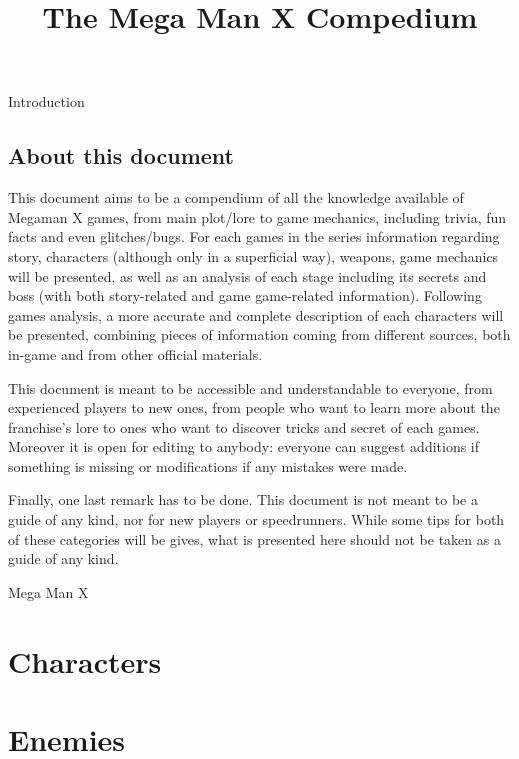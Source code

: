 \documentclass[openany]{report}
\title{The Mega Man X Compedium}
\begin{document}
\maketitle
\tableofcontents

\begin{chapter}{Introduction}
	\section{About this document}
	This document aims to be a compendium of all the knowledge available of Megaman X games, from main plot/lore to game mechanics, including trivia, fun facts and even glitches/bugs. For each games in the series information regarding story, characters (although only in a superficial way), weapons, game mechanics will be presented, as well as an analysis of each stage including its secrets and boss (with both story-related and game game-related information). Following games analysis, a more accurate and complete description of each characters will be presented, combining pieces of information coming from different sources, both in-game and from other official materials.
	
	This document is meant to be accessible and understandable to everyone, from experienced players to new ones, from people who want to learn more about the franchise's lore to ones who want to discover tricks and secret of each games. Moreover it is open for editing to anybody: everyone can suggest additions if something is missing or modifications if any mistakes were made.
	
	Finally, one last remark has to be done. This document is not meant to be a guide of any kind, nor for new players or speedrunners. While some tips for both of these categories will be gives, what is presented here should not be taken as a guide of any kind.
\end{chapter}

\begin{chapter}{Mega Man X}
	
\end{chapter}



\begin{appendices}
	\chapter {Characters}
	\chapter{Enemies}
	
\end{appendices}

 

\end{document}
